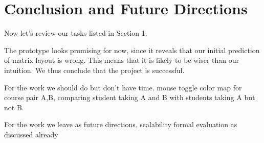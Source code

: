 \section{Conclusion and Future Directions}
\label{sec:conclusion}

Now let's review our tasks listed in Section 1.

The prototype looks promising for now, since it reveals that our initial prediction of matrix layout is wrong. This means that it is likely to be wiser than our intuition. We thus conclude that the project is successful. 

For the work we should do but don't have time.
mouse toggle
color map
for course pair A,B, comparing student taking A and B with students taking A but not B.

For the work we leave as future directions.
scalability
formal evaluation as discussed already
